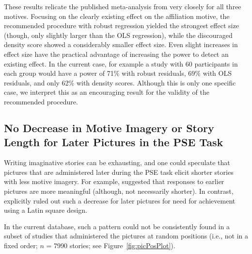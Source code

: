 \documentclass[man,a4paper,mask]{apa6}\usepackage[]{graphicx}\usepackage[]{color}
\begin{document}
These results relicate the published meta-analysis from \textcite{drescher_MetaanalyticEvidenceHigher_2016} very closely for all three motives. Focusing on the clearly existing effect on the affiliation motive, the recommended procedure with robust regression yielded the strongest effect size (though, only slightly larger than the OLS regression), while the discouraged density score showed a considerably smaller effect size. Even slight increases in effect size have the practical advantage of increasing the power to detect an existing effect. In the current case, for example a study with 60 participants in each group would have a power of 71\% with robust residuals, 69\% with OLS residuals, and only 62\% with density scores. 
Although this is only one specific case, we interpret this as an encouraging result for the validity of the recommended procedure.

\subsection{No Decrease in Motive Imagery or Story Length for Later Pictures in the PSE Task}
Writing imaginative stories can be exhausting, and one could speculate that pictures that are administered later during the PSE task elicit shorter stories with less motive imagery. For example, \textcite{smith_MethodologicalConsiderationsSteps_1992} suggested that responses to earlier pictures are more meaningful (although, not necessarily shorter). In contrast, \textcite[][Table 7.1]{mcclelland_achievement_1953} explicitly ruled out such a decrease for later pictures for need for achievement using a Latin square design.

In the current database, such a pattern could not be consistently found in a subset of studies that administered the pictures at random positions (i.e., not in a fixed order; $n$ = 7990 stories; see Figure~\ref{fig:picPosPlot}). 
\end{document}
